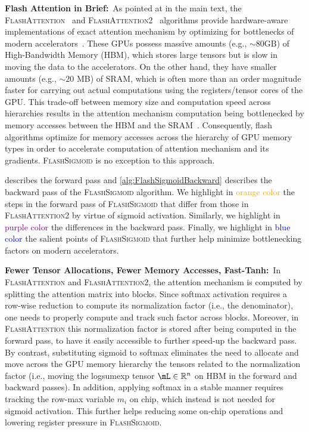 \noindent \textbf{Flash Attention in Brief:}\ As pointed at in the main text, the \textsc{FlashAttention}~\citep{DBLP:conf/nips/DaoFERR22} and \textsc{FlashAttention2}~\citep{DBLP:journals/corr/abs-2307-08691} algorithms provide hardware-aware implementations of exact attention mechanism by optimizing for bottlenecks of modern accelerators~\citep{DBLP:journals/micro/ChoquetteGGSK21,DBLP:journals/micro/Choquette23}. 
These GPUs possess massive amounts (e.g., $\sim80$GB) of High-Bandwidth Memory (HBM), which stores large tensors but is slow in moving the data to the accelerators.
On the other hand, they have smaller amounts (e.g., $\sim 20$ MB) of SRAM, which is often more than an order magnitude faster for carrying out actual computations using the registers/tensor cores of the GPU.
This trade-off between memory size and computation speed across hierarchies results in the attention mechanism computation being bottlenecked by memory accesses between the HBM and the SRAM~\citep{DBLP:conf/mlsys/IvanovDB0H21}.
Consequently, flash algorithms optimize for memory accesses across the hierarchy of GPU memory types in order to accelerate computation of attention mechanism and its gradients. \textsc{FlashSigmoid} is no exception to this approach.

 describes the forward pass and \cref{alg:FlashSigmoidBackward} describes the backward pass of the \textsc{FlashSigmoid} algorithm. 
We highlight in {\textcolor{orange}{orange color}} the steps in the forward pass of \textsc{FlashSigmoid} that differ from those in \textsc{FlashAttention2} by virtue of sigmoid activation. Similarly, we highlight in {\textcolor{purple}{purple color}} the differences in the backward pass. Finally, we highlight in {\textcolor{blue}{blue color}} the salient points of \textsc{FlashSigmoid} that further help minimize bottlenecking factors on modern accelerators.

\noindent\textbf{Fewer Tensor Allocations, Fewer Memory Accesses, Fast-\textrm{Tanh}:}\ 
In \textsc{FlashAttention} and \textsc{FlashAttention2}, the attention mechanism is computed by splitting the attention matrix into blocks. 
Since softmax activation requires a row-wise reduction to compute its normalization factor (i.e., the denominator), one needs to properly compute and track such factor across blocks. Moreover, in \textsc{FlashAttention} this normalization factor is stored after being computed in the forward pass, to have it easily accessible to further speed-up the backward pass.
By contrast, substituting sigmoid to softmax eliminates the need to allocate and move across the GPU memory hierarchy the tensors related to the normalization factor (i.e., moving the logsumexp tensor $\mL\in\mathbb{R}^n$ on HBM in the forward and backward passes).
In addition, applying softmax in a stable manner requires tracking the row-max variable $m_i$ on chip, which instead is not needed for sigmoid activation.
This further helps reducing some on-chip operations and lowering register pressure in \textsc{FlashSigmoid}. 


